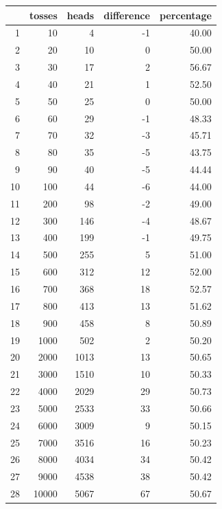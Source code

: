 \documentclass[portrait]{exam}
\begin{document}
  \begin{table}[H]
  \centering
    \begin{tabular}{rrrrr}
      \toprule
          & tosses & heads & difference & percentage \\
      \midrule
      1   & 10     & 4     & -1         & 40.00 \\
      2   & 20     & 10    & 0          & 50.00 \\
      3   & 30     & 17    & 2          & 56.67 \\
      4   & 40     & 21    & 1          & 52.50 \\
      5   & 50     & 25    & 0          & 50.00 \\
      6   & 60     & 29    & -1         & 48.33 \\
      7   & 70     & 32    & -3         & 45.71 \\
      8   & 80     & 35    & -5         & 43.75 \\
      9   & 90     & 40    & -5         & 44.44 \\
      10  & 100    & 44    & -6         & 44.00 \\
      11  & 200    & 98    & -2         & 49.00 \\
      12  & 300    & 146   & -4         & 48.67 \\
      13  & 400    & 199   & -1         & 49.75 \\
      14  & 500    & 255   & 5          & 51.00 \\
      15  & 600    & 312   & 12         & 52.00 \\
      16  & 700    & 368   & 18         & 52.57 \\
      17  & 800    & 413   & 13         & 51.62 \\
      18  & 900    & 458   & 8          & 50.89 \\
      19  & 1000   & 502   & 2          & 50.20 \\
      20  & 2000   & 1013  & 13         & 50.65 \\
      21  & 3000   & 1510  & 10         & 50.33 \\
      22  & 4000   & 2029  & 29         & 50.73 \\
      23  & 5000   & 2533  & 33         & 50.66 \\
      24  & 6000   & 3009  & 9          & 50.15 \\
      25  & 7000   & 3516  & 16         & 50.23 \\
      26  & 8000   & 4034  & 34         & 50.42 \\
      27  & 9000   & 4538  & 38         & 50.42 \\
      28  & 10000  & 5067  & 67         & 50.67 \\
       \bottomrule
    \end{tabular}
  \end{table}
\end{document}

